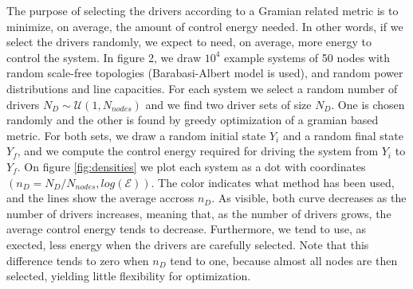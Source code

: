 \documentclass[conference]{IEEEtran}
\begin{document}
The purpose of selecting the drivers according to a Gramian related metric is to minimize, on average, the amount of control energy needed. In other words, if we select the drivers randomly, we expect to need, on average, more energy to control the system. In figure 2, we draw $10^4$ example systems of 50 nodes with random scale-free topologies (Barabasi-Albert model is used), and random power distributions and line capacities.  For each system we select a random number of drivers $N_D \sim \mathcal{U}(1,N_{nodes}) $ and we find two driver sets of size $N_D $. One is chosen randomly and the other is found by greedy optimization of a gramian based metric. For both sets, we draw a random initial state $Y_i$ and a random final state $Y_f$, and we compute the control energy required for driving the system from $Y_i$ to $Y_f$. On figure \ref{fig:densities} we plot each system as a dot with coordinates $(n_D = N_D / N_{nodes}, log(\mathcal{E}))$. The color indicates what method has been used, and the lines show the average accross $n_D$. As visible, both curve decreases as the number of drivers increases, meaning that, as the number of drivers grows, the average control energy tends to decrease. Furthermore, we tend to use, as exected, less energy when the drivers are carefully selected. Note that this difference tends to zero when $n_D$ tend to one, because almost all nodes are then selected, yielding little flexibility for optimization.

\end{document}

